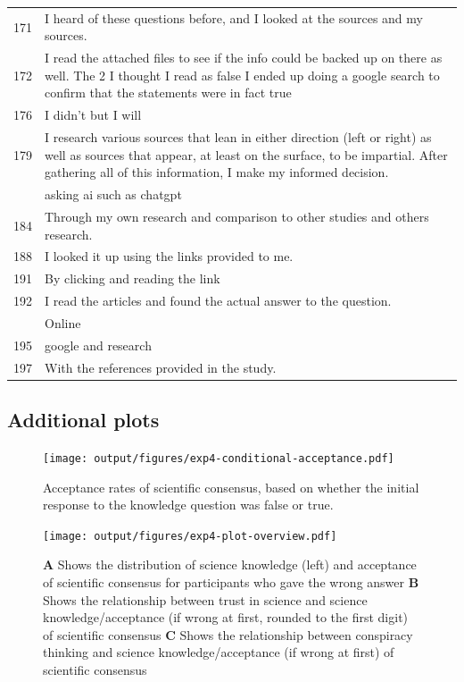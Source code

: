 \documentclass[
  doc,floatsintext]{apa6}
\begin{document}
\begin{longtable}[t]{>{}r>{\raggedright\arraybackslash}p{30em}}
171 & I heard of these questions before, and I looked at the sources and my sources.\\
172 & I read the attached files to see if the info could be backed up on there as well. The 2 I thought I read as false I ended up doing a google search to confirm that the statements were in fact true\\
176 & I didn’t but I will\\
179 & I research various sources that lean in either direction (left or right) as well as sources that appear, at least on the surface, to be impartial. After gathering all of this information, I make my informed decision.\\
\addlinespace
183 & asking ai such as chatgpt\\
184 & Through my own research and comparison to other studies and others research.\\
188 & I looked it up using the links provided to me.\\
191 & By clicking and reading the link\\
192 & I read the articles and found the actual answer to the question.\\
\addlinespace
194 & Online\\
195 & google and research\\
197 & With the references provided in the study.\\
\bottomrule
\end{longtable}

\subsection{Additional plots}\label{additional-plots-3}



\begin{figure}
\centering
\texttt{[image: output/figures/exp4-conditional-acceptance.pdf]}
\caption{\label{fig:exp4-conditional-acceptance}Acceptance rates of scientific consensus, based on whether the initial response to the knowledge question was false or true.}
\end{figure}



\begin{figure}
\centering
\texttt{[image: output/figures/exp4-plot-overview.pdf]}
\caption{\label{fig:exp4-plot-overview}\textbf{A} Shows the distribution of science knowledge (left) and acceptance of scientific consensus for participants who gave the wrong answer \textbf{B} Shows the relationship between trust in science and science knowledge/acceptance (if wrong at first, rounded to the first digit) of scientific consensus \textbf{C} Shows the relationship between conspiracy thinking and science knowledge/acceptance (if wrong at first) of scientific consensus}
\end{figure}
\end{document}
